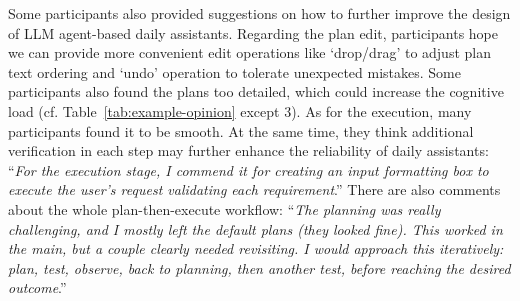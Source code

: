 Some participants also provided suggestions on how to further improve the design of LLM agent-based daily assistants. 
Regarding the plan edit, participants hope we can provide more convenient edit operations like `drop/drag' to adjust plan text ordering and `undo' operation to tolerate unexpected mistakes. 
Some participants also found the plans too detailed, which could increase the cognitive load (cf. Table~\ref{tab:example-opinion} except 3). 
As for the execution, many participants found it to be smooth. %
At the same time, they think additional verification in each step may further enhance the reliability of daily assistants: ``\textit{For the execution stage, I commend it for creating an input formatting box to execute the user's request validating each requirement}.''
There are also comments about the whole plan-then-execute workflow: ``\textit{The planning was really challenging, and I mostly left the default plans (they looked fine). 
This worked in the main, but a couple clearly needed revisiting. I would approach this iteratively: plan, test, observe, back to planning, then another test, before reaching the desired outcome}.'' 


